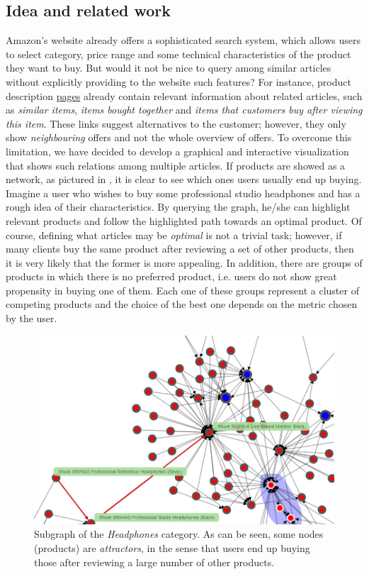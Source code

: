 \documentclass[a4paper,12pt]{article}
\begin{document}
\subsection{Idea and related work}
Amazon's website already offers a sophisticated search system, which allows users to select category, price range and some technical characteristics of the product they want to buy. But would it not be nice to query among similar articles without explicitly providing to the website such features? For instance, product description  \href{https://www.amazon.com/Acer-E5-575-33BM-15-6-Inch-Notebook-Generation/dp/B01K1IO3QW/ref=sr_1_3?s=pc&ie=UTF8&qid=1512207600&sr=1-3&keywords=laptop}{pages} already contain relevant information about related articles, such as \textit{similar items}, \textit{items bought together} and \textit{items that customers buy after viewing this item}. These links suggest alternatives to the customer; however, they only show \textit{neighbouring} offers and not the whole overview of offers. To overcome this limitation, we have decided to develop a graphical and interactive visualization that shows such relations among multiple articles. If products are showed as a network, as pictured in , it is clear to see which ones users usually end up buying. Imagine a user who wishes to buy some professional studio headphones and has a rough idea of their characteristics. By querying the graph, he/she can highlight relevant products and follow the highlighted path towards an optimal product. Of course, defining what articles may be \emph{optimal} is not a trivial task; however, if many clients buy the same product after reviewing a set of other products, then it is very likely that the former is more appealing. In addition, there are groups of products in which there is no preferred product, i.e. users do not show great propensity in buying one of them. Each one of these groups represent a cluster of competing products and the choice of the best one depends on the metric chosen by the user. 
\begin{figure}[H]
	\centering{}
	\includegraphics[width=\textwidth]{img/graph_nav.png}
	\caption{Subgraph of the \emph{Headphones} category. As can be seen, some nodes (products) are \emph{attractors}, in the sense that users end up buying those after reviewing a large number of other products.}
	\label{fig:graphNav}
\end{figure}
\end{document}
